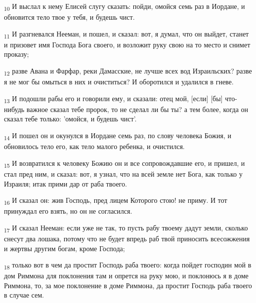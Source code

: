 \begin{tcolorbox}
\textsubscript{10} И выслал к нему Елисей слугу сказать: пойди, омойся семь раз в Иордане, и обновится тело твое у тебя, и будешь чист.
\end{tcolorbox}
\begin{tcolorbox}
\textsubscript{11} И разгневался Нееман, и пошел, и сказал: вот, я думал, что он выйдет, станет и призовет имя Господа Бога своего, и возложит руку свою на то место и снимет проказу;
\end{tcolorbox}
\begin{tcolorbox}
\textsubscript{12} разве Авана и Фарфар, реки Дамасские, не лучше всех вод Израильских? разве я не мог бы омыться в них и очиститься? И оборотился и удалился в гневе.
\end{tcolorbox}
\begin{tcolorbox}
\textsubscript{13} И подошли рабы его и говорили ему, и сказали: отец мой, [если] [бы] что-нибудь важное сказал тебе пророк, то не сделал ли бы ты? а тем более, когда он сказал тебе только: 'омойся, и будешь чист'.
\end{tcolorbox}
\begin{tcolorbox}
\textsubscript{14} И пошел он и окунулся в Иордане семь раз, по слову человека Божия, и обновилось тело его, как тело малого ребенка, и очистился.
\end{tcolorbox}
\begin{tcolorbox}
\textsubscript{15} И возвратился к человеку Божию он и все сопровождавшие его, и пришел, и стал пред ним, и сказал: вот, я узнал, что на всей земле нет Бога, как только у Израиля; итак прими дар от раба твоего.
\end{tcolorbox}
\begin{tcolorbox}
\textsubscript{16} И сказал он: жив Господь, пред лицем Которого стою! не приму. И тот принуждал его взять, но он не согласился.
\end{tcolorbox}
\begin{tcolorbox}
\textsubscript{17} И сказал Нееман: если уже не так, то пусть рабу твоему дадут земли, сколько снесут два лошака, потому что не будет впредь раб твой приносить всесожжения и жертвы другим богам, кроме Господа;
\end{tcolorbox}
\begin{tcolorbox}
\textsubscript{18} только вот в чем да простит Господь раба твоего: когда пойдет господин мой в дом Риммона для поклонения там и опрется на руку мою, и поклонюсь я в доме Риммона, то, за мое поклонение в доме Риммона, да простит Господь раба твоего в случае сем.
\end{tcolorbox}
